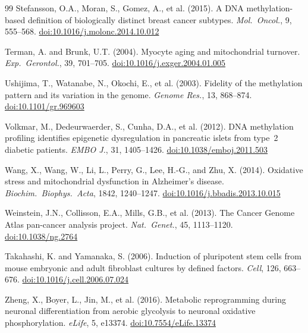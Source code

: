 \documentclass[12pt,a4paper]{article}
\newcommand{\doi}[1]{\href{https://doi.org/#1}{doi:#1}}
\begin{document}
\begin{thebibliography}{99}
Stefansson, O.A., Moran, S., Gomez, A., et al. (2015).
A DNA methylation-based definition of biologically distinct breast cancer subtypes.
\textit{Mol.\ Oncol.}, 9, 555--568.
\doi{10.1016/j.molonc.2014.10.012}

Terman, A. and Brunk, U.T. (2004).
Myocyte aging and mitochondrial turnover.
\textit{Exp.\ Gerontol.}, 39, 701--705.
\doi{10.1016/j.exger.2004.01.005}

Ushijima, T., Watanabe, N., Okochi, E., et al. (2003).
Fidelity of the methylation pattern and its variation in the genome.
\textit{Genome Res.}, 13, 868--874.
\doi{10.1101/gr.969603}

Volkmar, M., Dedeurwaerder, S., Cunha, D.A., et al. (2012).
DNA methylation profiling identifies epigenetic dysregulation in pancreatic islets from type~2 diabetic patients.
\textit{EMBO J.}, 31, 1405--1426.
\doi{10.1038/emboj.2011.503}

Wang, X., Wang, W., Li, L., Perry, G., Lee, H.-G., and Zhu, X. (2014).
Oxidative stress and mitochondrial dysfunction in Alzheimer's disease.
\textit{Biochim.\ Biophys.\ Acta}, 1842, 1240--1247.
\doi{10.1016/j.bbadis.2013.10.015}

Weinstein, J.N., Collisson, E.A., Mills, G.B., et al. (2013).
The Cancer Genome Atlas pan-cancer analysis project.
\textit{Nat.\ Genet.}, 45, 1113--1120.
\doi{10.1038/ng.2764}

Takahashi, K. and Yamanaka, S. (2006).
Induction of pluripotent stem cells from mouse embryonic and adult fibroblast cultures by defined factors.
\textit{Cell}, 126, 663--676.
\doi{10.1016/j.cell.2006.07.024}

Zheng, X., Boyer, L., Jin, M., et al. (2016).
Metabolic reprogramming during neuronal differentiation from aerobic glycolysis to neuronal oxidative phosphorylation.
\textit{eLife}, 5, e13374.
\doi{10.7554/eLife.13374}

\end{thebibliography}


\clearpage
\appendix
\renewcommand{\thesection}{S\arabic{section}}
\renewcommand{\thetable}{S\arabic{table}}
\setcounter{section}{0}
\setcounter{table}{0}
\end{document}
